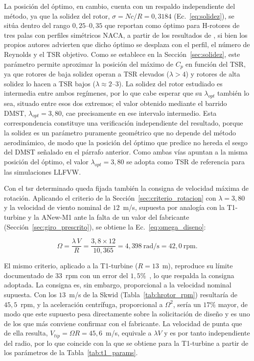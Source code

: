 La posición del óptimo, en cambio, cuenta con un respaldo independiente del método, ya que la solidez del rotor, $\sigma = Nc/R = 0{,}3184$ (Ec.~\ref{eq:solidez}), se sitúa dentro del rango $0{,}25$--$0{,}35$ que \textcite{Essahraoui2026} reportan como óptimo para H-rotores de tres palas con perfiles simétricos NACA, a partir de los resultados de \textcite{Subramanian2017}, si bien los propios autores advierten que dicho óptimo se desplaza con el perfil, el número de Reynolds y el TSR objetivo. Como se establece en la Sección~\ref{sec:solidez}, este parámetro permite aproximar la posición del máximo de $C_p$ en función del TSR, ya que rotores de baja solidez operan a TSR elevados ($\lambda > 4$) y rotores de alta solidez lo hacen a TSR bajos ($\lambda \approx 2$--$3$). La solidez del rotor estudiado es intermedia entre ambos regímenes, por lo que cabe esperar que su $\lambda_{opt}$ también lo sea, situado entre esos dos extremos; el valor obtenido mediante el barrido DMST, $\lambda_{opt} = 3{,}80$, cae precisamente en ese intervalo intermedio. Esta correspondencia constituye una verificación independiente del resultado, porque la solidez es un parámetro puramente geométrico que no depende del método aerodinámico, de modo que la posición del óptimo que predice no hereda el sesgo del DMST señalado en el párrafo anterior. Como ambas vías apuntan a la misma posición del óptimo, el valor $\lambda_{opt} = 3{,}80$ se adopta como TSR de referencia para las simulaciones LLFVW.

Con el \gls{tsr} determinado queda fijada también la consigna de velocidad máxima de rotación. Aplicando el criterio de la Sección~\ref{sec:criterio_rotacion} con $\lambda = 3{,}80$ y la velocidad de viento nominal de $12$~m/s, supuesta por analogía con la T1-turbine y la ANew-M1 ante la falta de un valor del fabricante (Sección~\ref{sec:giro_prescrito}), se obtiene la Ec.~\ref{eq:omega_diseno}:

\begin{equation}
    \Omega = \frac{\lambda \, V}{R} = \frac{3{,}8 \times 12}{10{,}365} = 4{,}398\ \text{rad/s} = 42{,}0\ \text{rpm}.
    \label{eq:omega_diseno}
\end{equation}

El mismo criterio, aplicado a la T1-turbine ($R = 13$~m), reproduce su límite documentado de $33$~rpm con un error del $1{,}5\%$~\parencite{Mollerstrom2017}, lo que respalda la consigna adoptada. La consigna es, sin embargo, proporcional a la velocidad nominal supuesta. Con los $13$~m/s de la Skwid (Tabla~\ref{tab:hrotor_rpm}) resultaría de $45{,}5$~rpm, y la aceleración centrífuga, proporcional a $\Omega^2$, sería un $17\%$ mayor, de modo que este supuesto pesa directamente sobre la solicitación de diseño y es uno de los que más conviene confirmar con el fabricante. La velocidad de punta que de ella resulta, $V_{tip} = \Omega R = 45{,}6$~m/s, equivale a $\lambda V$ y es por tanto independiente del radio, por lo que coincide con la que se obtiene para la T1-turbine a partir de los parámetros de la Tabla~\ref{tab:t1_params}.

